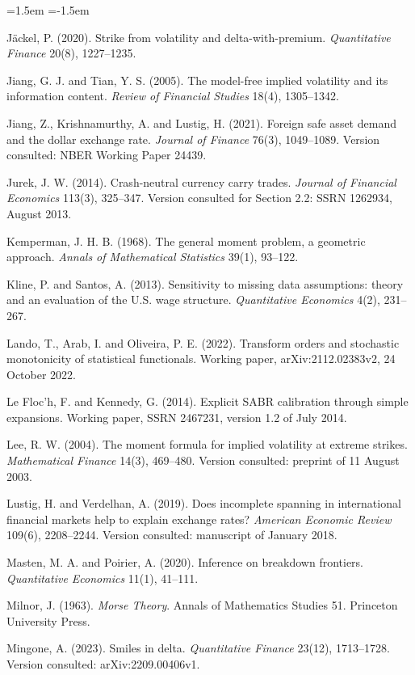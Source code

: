 \documentclass[11pt]{article}
\theoremstyle{remark}
\begin{document}
\begin{list}{}{\leftmargin=1.5em \itemindent=-1.5em \itemsep=2pt \parsep=0pt}
\item J\"ackel, P. (2020). Strike from volatility and delta-with-premium. \emph{Quantitative Finance} 20(8), 1227--1235.
\item Jiang, G. J. and Tian, Y. S. (2005). The model-free implied volatility and its information content. \emph{Review of Financial Studies} 18(4), 1305--1342.
\item Jiang, Z., Krishnamurthy, A. and Lustig, H. (2021). Foreign safe asset demand and the dollar exchange rate. \emph{Journal of Finance} 76(3), 1049--1089. Version consulted: NBER Working Paper 24439.
\item Jurek, J. W. (2014). Crash-neutral currency carry trades. \emph{Journal of Financial Economics} 113(3), 325--347. Version consulted for Section 2.2: SSRN 1262934, August 2013.
\item Kemperman, J. H. B. (1968). The general moment problem, a geometric approach. \emph{Annals of Mathematical Statistics} 39(1), 93--122.
\item Kline, P. and Santos, A. (2013). Sensitivity to missing data assumptions: theory and an evaluation of the U.S. wage structure. \emph{Quantitative Economics} 4(2), 231--267.
\item Lando, T., Arab, I. and Oliveira, P. E. (2022). Transform orders and stochastic monotonicity of statistical functionals. Working paper, arXiv:2112.02383v2, 24 October 2022.
\item Le Floc'h, F. and Kennedy, G. (2014). Explicit SABR calibration through simple expansions. Working paper, SSRN 2467231, version 1.2 of July 2014.
\item Lee, R. W. (2004). The moment formula for implied volatility at extreme strikes. \emph{Mathematical Finance} 14(3), 469--480. Version consulted: preprint of 11 August 2003.
\item Lustig, H. and Verdelhan, A. (2019). Does incomplete spanning in international financial markets help to explain exchange rates? \emph{American Economic Review} 109(6), 2208--2244. Version consulted: manuscript of January 2018.
\item Masten, M. A. and Poirier, A. (2020). Inference on breakdown frontiers. \emph{Quantitative Economics} 11(1), 41--111.
\item Milnor, J. (1963). \emph{Morse Theory}. Annals of Mathematics Studies 51. Princeton University Press.
\item Mingone, A. (2023). Smiles in delta. \emph{Quantitative Finance} 23(12), 1713--1728. Version consulted: arXiv:2209.00406v1.

\end{list}
\end{document}
